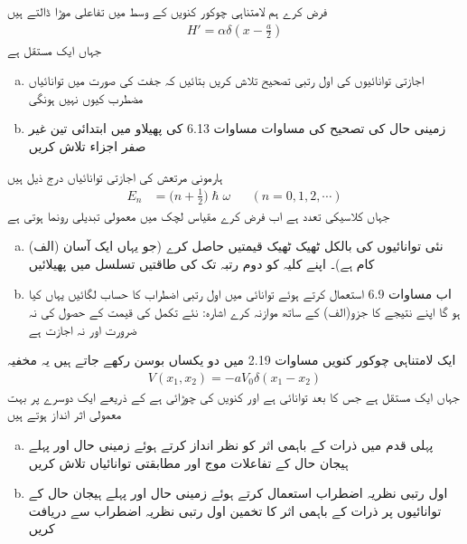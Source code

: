 فرض کرے ہم لامتناہی چوکور کنویں کے وسط میں  تفاعلی موڑا ڈالتے ہیں 
\begin{align*}
H' = \alpha \delta (x - \frac{a}{2})
\end{align*}
جہاں  ایک مستقل ہے 
\begin{enumerate}[a.]
\item
 اجازتی توانائیوں کی اول رتبی تصحیح تلاش کریں بتائیں کہ جفت  کی صورت میں توانائیاں مضطرب کیوں نہیں ہونگی   
\item
 زمینی حال کی  تصحیح  کی مساوات مساوات 6.13 کی پھیلاو  میں ابتدائی تین غیر صفر اجزاء تلاش کریں  
 \end{enumerate}

ہارمونی مرتعش  
کی اجازتی توانائیاں درج ذیل ہیں 
\begin{align*}
E_n &= \big(n + \frac{1}{2}\big) \hslash \omega  && (n = 0, 1, 2, \cdots )
\end{align*}
جہاں  کلاسیکی تعدد ہے اب فرض کرے مقیاس لچک میں معمولی تبدیلی رونما ہوتی ہے 
\begin{enumerate}[a.]
\item
(الف) نئی  توانائیوں کی بالکل ٹھیک ٹھیک قیمتیں  حاصل  کرے (جو یہاں ایک آسان کام ہے)۔ اپنے  کلیہ کو دوم رتبہ تک  کی طاقتیں تسلسل میں پھیلائیں 
\item
 اب مساوات 6.9 استعمال کرتے ہوئے توانائی میں اول رتبی اضطراب کا حساب لگائیں یہاں  کیا  ہو گا اپنے نتیجے کا جزو(الف) کے ساتھ موازنہ کرے اشارہ: نئے تکمل کی قیمت کے حصول کی نہ ضرورت اور نہ اجازت ہے 
 \end{enumerate}
ایک لامتناہی چوکور کنویں مساوات 2.19 میں دو یکساں بوسن رکھے جاتے ہیں یہ مخفیہ 
\begin{align*}
V(x_1, x_2) = -aV_0\delta (x_1 - x_2)
\end{align*}
 جہاں  ایک مستقل ہے جس کا بعد توانائی ہے  اور  کنویں کی چوڑائی ہے کے ذریعے ایک دوسرے پر بہت معمولی اثر انداز ہوتے ہیں 
\begin{enumerate}[a.]
\item
 پہلی قدم میں ذرات کے باہمی   اثر  کو نظر انداز کرتے ہوئے زمینی حال اور پہلے ہیجان حال کے تفاعلات موج اور مطابقتی توانائیاں تلاش کریں 
\item
 اول رتبی نظریہ اضطراب استعمال کرتے ہوئے زمینی حال اور پہلے    ہیجان  حال کے توانائیوں پر ذرات کے باہمی  اثر کا تخمین اول رتبی نظریہ اضطراب سے دریافت کریں 
 \end{enumerate}

